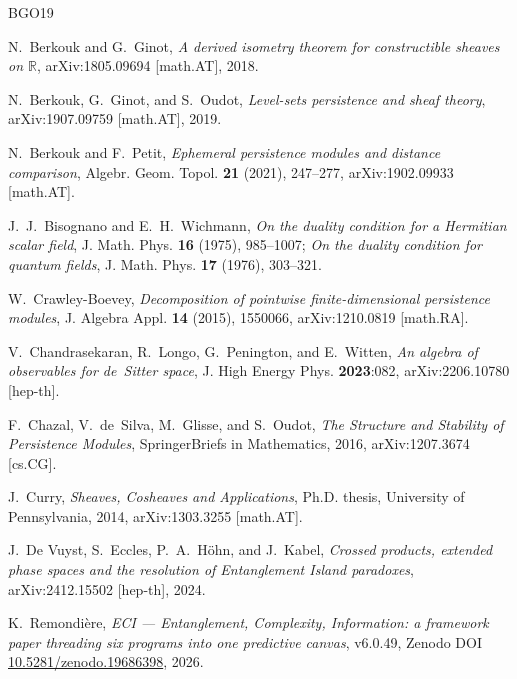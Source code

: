 \documentclass[12pt,a4paper]{amsart}
\theoremstyle{definition}
\begin{document}

\begin{thebibliography}{BGO19}

N.~Berkouk and G.~Ginot,
\textit{A derived isometry theorem for constructible sheaves on $\mathbb{R}$},
arXiv:1805.09694 [math.AT], 2018.

N.~Berkouk, G.~Ginot, and S.~Oudot,
\textit{Level-sets persistence and sheaf theory},
arXiv:1907.09759 [math.AT], 2019.

N.~Berkouk and F.~Petit,
\textit{Ephemeral persistence modules and distance comparison},
Algebr. Geom. Topol. \textbf{21} (2021), 247--277,
arXiv:1902.09933 [math.AT].

J.~J.~Bisognano and E.~H.~Wichmann,
\textit{On the duality condition for a Hermitian scalar field},
J. Math. Phys. \textbf{16} (1975), 985--1007;
\textit{On the duality condition for quantum fields},
J. Math. Phys. \textbf{17} (1976), 303--321.

W.~Crawley-Boevey,
\textit{Decomposition of pointwise finite-dimensional persistence modules},
J. Algebra Appl. \textbf{14} (2015), 1550066,
arXiv:1210.0819 [math.RA].

V.~Chandrasekaran, R.~Longo, G.~Penington, and E.~Witten,
\textit{An algebra of observables for de~Sitter space},
J. High Energy Phys. \textbf{2023}:082,
arXiv:2206.10780 [hep-th].

F.~Chazal, V.~de~Silva, M.~Glisse, and S.~Oudot,
\textit{The Structure and Stability of Persistence Modules},
SpringerBriefs in Mathematics, 2016,
arXiv:1207.3674 [cs.CG].

J.~Curry,
\textit{Sheaves, Cosheaves and Applications},
Ph.D. thesis, University of Pennsylvania, 2014,
arXiv:1303.3255 [math.AT].

J.~De Vuyst, S.~Eccles, P.~A.~H\"ohn, and J.~Kabel,
\textit{Crossed products, extended phase spaces and the resolution of
Entanglement Island paradoxes},
arXiv:2412.15502 [hep-th], 2024.

K.~Remondi\`ere,
\textit{ECI --- Entanglement, Complexity, Information: a framework paper
threading six programs into one predictive canvas},
v6.0.49, Zenodo DOI \href{https://doi.org/10.5281/zenodo.19686398}{10.5281/zenodo.19686398},
2026.


\end{thebibliography}
\end{document}
